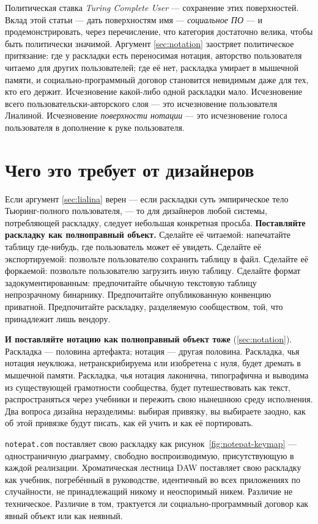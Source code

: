 \documentclass[10pt,letterpaper,twocolumn]{article}
\begin{document}
Политическая ставка \emph{Turing Complete User} --- сохранение этих поверхностей. Вклад этой статьи --- дать поверхностям имя --- \emph{социальное ПО} --- и продемонстрировать, через перечисление, что категория достаточно велика, чтобы быть политически значимой. Аргумент \textsection\ref{sec:notation} заостряет политическое притязание: где у раскладки есть переносимая нотация, авторство пользователя читаемо для других пользователей; где её нет, раскладка умирает в мышечной памяти, и социально-программный договор становится невидимым даже для тех, кто его держит. Исчезновение какой-либо одной раскладки мало. Исчезновение всего пользовательски-авторского слоя --- это исчезновение пользователя Лиалиной. Исчезновение \emph{поверхности нотации} --- это исчезновение голоса пользователя в дополнение к руке пользователя.

\section{Чего это требует от дизайнеров}
\label{sec:design}

Если аргумент \textsection\ref{sec:lialina} верен --- если раскладки суть эмпирическое тело Тьюринг-полного пользователя, --- то для дизайнеров любой системы, потребляющей раскладку, следует небольшая конкретная просьба. \textbf{Поставляйте раскладку как полноправный объект.} Сделайте её читаемой: напечатайте таблицу где-нибудь, где пользователь может её увидеть. Сделайте её экспортируемой: позвольте пользователю сохранить таблицу в файл. Сделайте её форкаемой: позвольте пользователю загрузить иную таблицу. Сделайте формат задокументированным: предпочитайте обычную текстовую таблицу непрозрачному бинарнику. Предпочитайте опубликованную конвенцию приватной. Предпочитайте раскладку, разделяемую сообществом, той, что принадлежит лишь вендору.

\textbf{И поставляйте нотацию как полноправный объект тоже} (\textsection\ref{sec:notation}). Раскладка --- половина артефакта; нотация --- другая половина. Раскладка, чья нотация неуклюжа, нетранскрибируема или изобретена с нуля, будет дремать в мышечной памяти. Раскладка, чья нотация лаконична, типографична и выводима из существующей грамотности сообщества, будет путешествовать как текст, распространяться через учебники и пережить свою нынешнюю среду исполнения. Два вопроса дизайна неразделимы: выбирая привязку, вы выбираете заодно, как об этой привязке будут писать, как ей учить и как её портировать.

\texttt{notepat.com} поставляет свою раскладку как рисунок~\ref{fig:notepat-keymap} --- одностраничную диаграмму, свободно воспроизводимую, присутствующую в каждой реализации. Хроматическая лестница DAW поставляет свою раскладку как учебник, погребённый в руководстве, идентичный во всех приложениях по случайности, не принадлежащий никому и неоспоримый никем. Различие не техническое. Различие в том, трактуется ли социально-программный договор как явный объект или как неявный.
\end{document}

